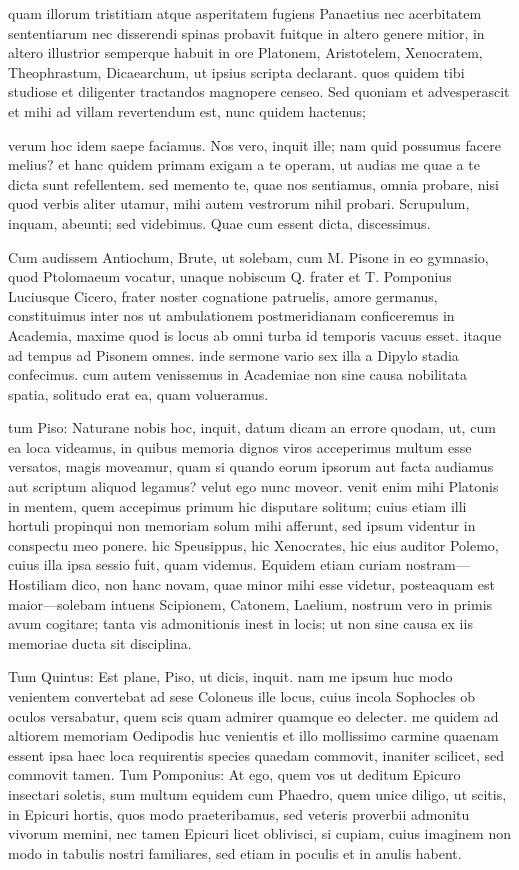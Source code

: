  quam illorum tristitiam atque asperitatem fugiens Panaetius nec acerbitatem sententiarum nec disserendi spinas probavit fuitque in altero genere mitior, in altero illustrior semperque habuit in ore Platonem, Aristotelem, Xenocratem, Theophrastum, Dicaearchum, ut ipsius scripta declarant. quos quidem tibi studiose et diligenter tractandos magnopere censeo. Sed quoniam et advesperascit et mihi ad villam revertendum est, nunc quidem hactenus;

 verum hoc idem saepe faciamus. Nos vero, inquit ille; nam quid possumus facere melius? et hanc quidem primam exigam a te operam, ut audias me quae a te dicta sunt refellentem. sed memento te, quae nos sentiamus, omnia probare, nisi quod verbis aliter utamur, mihi autem vestrorum nihil probari. Scrupulum, inquam, abeunti; sed videbimus. Quae cum essent dicta, discessimus.

 Cum audissem Antiochum, Brute, ut solebam, cum M. Pisone in eo gymnasio, quod Ptolomaeum vocatur, unaque nobiscum Q. frater et T. Pomponius Luciusque Cicero, frater noster cognatione patruelis, amore germanus, constituimus inter nos ut ambulationem postmeridianam conficeremus in Academia, maxime quod is locus ab omni turba id temporis vacuus esset. itaque ad tempus ad Pisonem omnes. inde sermone vario sex illa a Dipylo stadia confecimus. cum autem venissemus in Academiae non sine causa nobilitata spatia, solitudo erat ea, quam volueramus.

 tum Piso: Naturane nobis hoc, inquit, datum dicam an errore quodam, ut, cum ea loca videamus, in quibus memoria dignos viros acceperimus multum esse versatos, magis moveamur, quam si quando eorum ipsorum aut facta audiamus aut scriptum aliquod legamus? velut ego nunc moveor. venit enim mihi Platonis in mentem, quem accepimus primum hic disputare solitum; cuius etiam illi hortuli propinqui non memoriam solum mihi afferunt, sed ipsum videntur in conspectu meo ponere. hic Speusippus, hic Xenocrates, hic eius auditor Polemo, cuius illa ipsa sessio fuit, quam videmus. Equidem etiam curiam nostram—Hostiliam dico, non hanc novam, quae minor mihi esse videtur, posteaquam est maior—solebam intuens Scipionem, Catonem, Laelium, nostrum vero in primis avum cogitare; tanta vis admonitionis inest in locis; ut non sine causa ex iis memoriae ducta sit disciplina.

 Tum Quintus: Est plane, Piso, ut dicis, inquit. nam me ipsum huc modo venientem convertebat ad sese Coloneus ille locus, cuius incola Sophocles ob oculos versabatur, quem scis quam admirer quamque eo delecter. me quidem ad altiorem memoriam Oedipodis huc venientis et illo mollissimo carmine quaenam essent ipsa haec loca requirentis species quaedam commovit, inaniter scilicet, sed commovit tamen. Tum Pomponius: At ego, quem vos ut deditum Epicuro insectari soletis, sum multum equidem cum Phaedro, quem unice diligo, ut scitis, in Epicuri hortis, quos modo praeteribamus, sed veteris proverbii admonitu vivorum memini, nec tamen Epicuri licet oblivisci, si cupiam, cuius imaginem non modo in tabulis nostri familiares, sed etiam in poculis et in anulis habent.

